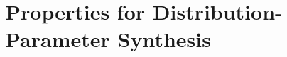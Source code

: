 \documentclass{article}
\newcommand{\eqdef}{\ensuremath{\stackrel{\text{\tiny def}}{=}}}
\renewcommand{\_}{\underline{~}}
\begin{document}
%
%
%
%
%

\newpage

\section*{Properties for Distribution-Parameter Synthesis}
\end{document}

